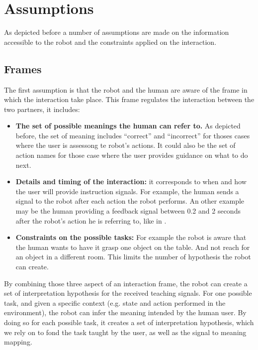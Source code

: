 \section{Assumptions}

As depicted before a number of assumptions are made on the information accessible to the robot and the constraints applied on the interaction.

\subsection{Frames}

The first assumption is that the robot and the human are aware of the frame in which the interaction take place. This frame regulates the interaction between the two partners, it includes:

\begin{itemize}

\item \textbf{The set of possible meanings the human can refer to.} As depicted before, the set of meaning includes ``correct'' and ``incorrect'' for thoses cases where the user is assessong te robot's actions. It could also be the set of action names for those case where the user provides guidance on what to do next.

\item \textbf{Details and timing of the interaction:} it corresponds to when and how the user will provide instruction signals. For example, the human sends a signal to the robot after each action the robot performs. An other example may be the human providing a feedback signal between 0.2 and 2 seconds after the robot's action he is referring to, like in \cite{knox2009interactively}.

\item \textbf{Constraints on the possible tasks:} For example the robot is aware that the human wants to have it grasp one object on the table. And not reach for an object in a different room. This limits the number of hypothesis the robot can create.

\end{itemize}

By combining those three aspect of an interaction frame, the robot can create a set of interpretation hypothesis for the received teaching signals. For one possible task, and given a specific context (e.g. state and action performed in the environment), the robot can infer the meaning intended by the human user. By doing so for each possible task, it creates a set of interpretation hypothesis, which we rely on to fond the task taught by the user, as well as the signal to meaning mapping.

